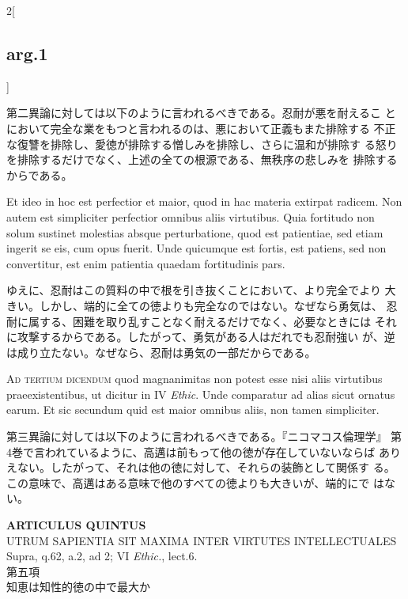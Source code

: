 \documentclass[paper=a4paper,fontsize=10pt,jafontsize=9pt,titlepage]{jlreq}
\begin{document}
\begin{paracol}{2}[\subsection{arg.1}]
\switchcolumn

第二異論に対しては以下のように言われるべきである。忍耐が悪を耐えるこ
 とにおいて完全な業をもつと言われるのは、悪において正義もまた排除する
 不正な復讐を排除し、愛徳が排除する憎しみを排除し、さらに温和が排除す
 る怒りを排除するだけでなく、上述の全ての根源である、無秩序の悲しみを
 排除するからである。

\switchcolumn*

Et ideo in hoc est perfectior et maior, quod in hac materia extirpat
radicem. Non autem est simpliciter perfectior omnibus aliis
virtutibus. Quia fortitudo non solum sustinet molestias absque
perturbatione, quod est patientiae, sed etiam ingerit se eis, cum opus
fuerit. Unde quicumque est fortis, est patiens, sed non convertitur,
est enim patientia quaedam fortitudinis pars.

\switchcolumn

ゆえに、忍耐はこの質料の中で根を引き抜くことにおいて、より完全でより
 大きい。しかし、端的に全ての徳よりも完全なのではない。なぜなら勇気は、
 忍耐に属する、困難を取り乱すことなく耐えるだけでなく、必要なときには
 それに攻撃するからである。したがって、勇気がある人はだれでも忍耐強い
 が、逆は成り立たない。なぜなら、忍耐は勇気の一部だからである。

\switchcolumn*[\subsection{ad.3}]

{\scshape Ad tertium dicendum} quod magnanimitas non potest esse nisi
aliis virtutibus praeexistentibus, ut dicitur in IV {\itshape
Ethic}. Unde comparatur ad alias sicut ornatus earum. Et sic secundum
quid est maior omnibus aliis, non tamen simpliciter.

\switchcolumn

第三異論に対しては以下のように言われるべきである。『ニコマコス倫理学』
第4巻で言われているように、高邁は前もって他の徳が存在していないならば
ありえない。したがって、それは他の徳に対して、それらの装飾として関係す
る。この意味で、高邁はある意味で他のすべての徳よりも大きいが、端的にで
はない。

\end{paracol}
\newpage
{}
{}
\setcounter{section}{5}
\setcounter{subsection}{0}




\begin{center}
{\Large {\bfseries ARTICULUS QUINTUS}}\\
{\large UTRUM SAPIENTIA SIT MAXIMA INTER VIRTUTES INTELLECTUALES}
{\footnotesize Supra, q.62, a.2, ad 2; VI {\itshape Ethic.}, lect.6.}\\
{\Large 第五項\\知恵は知性的徳の中で最大か}
\end{center}
\end{document}
